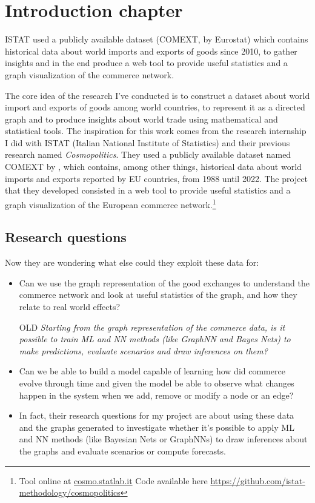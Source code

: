 \chapter{Introduction chapter}

ISTAT used a publicly available dataset (COMEXT, by Eurostat) which contains historical data about world imports and exports of goods since 2010, to gather insights and in the end produce a web tool to provide useful statistics and a graph visualization of the commerce network. 

The core idea of the research I've conducted is to construct a dataset about world import and exports of goods among world countries, to represent it as a directed graph and to produce insights about world trade using mathematical and statistical tools.
The inspiration for this work comes from the research internship I did with ISTAT (Italian National Institute of Statistics) and their previous research named \textit{Cosmopolitics}. %
They used a publicly available dataset named COMEXT by \textcite{eurostat2022comext}, which contains, among other things, historical data about world imports and exports reported by EU countries, from 1988 until 2022. The project that they developed consisted in a web tool to provide useful statistics and a graph visualization of the European commerce network.\footnote{Tool online at  \href{https://cosmo.statlab.it/}{cosmo.statlab.it} Code available here \url{https://github.com/istat-methodology/cosmopolitics}}


\section{Research questions}

Now they are wondering what else could they exploit these data for:
\begin{itemize}
    \item Can we use the graph representation of the good exchanges to understand the commerce network and look at useful statistics of the graph, and how they relate to real world effects?
    \item[OLD] \textit{Starting from the graph representation of the commerce data, is it possible to train ML and NN methods (like GraphNN and Bayes Nets) to make predictions, evaluate scenarios and draw inferences on them?}
    \item Can we be able to build a model capable of learning how did commerce evolve through time and given the model be able to observe what changes happen in the system when we add, remove or modify a node or an edge?
    \item In fact, their research questions for my project are about using these data and the graphs generated to investigate whether it’s possible to apply ML and NN methods (like Bayesian Nets or GraphNNs) to draw inferences about the graphs and evaluate scenarios or compute forecasts.
\end{itemize}


